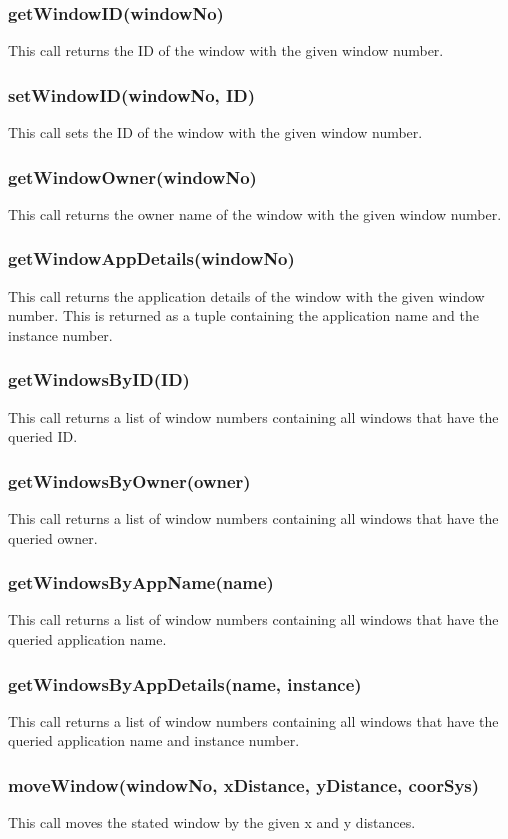 \documentclass{acm_proc_article-sp}
\begin{document}
\subsubsection{getWindowID(windowNo)}
This call returns the ID of the window with the given window number.
\subsubsection{setWindowID(windowNo, ID)}
This call sets the ID of the window with the given window number.
\subsubsection{getWindowOwner(windowNo)}
This call returns the owner name of the window with the given window number.
\subsubsection{getWindowAppDetails(windowNo)}
This call returns the application details of the window with the given window number. This is returned as a tuple containing the application name and the instance number.
\subsubsection{getWindowsByID(ID)}
This call returns a list of window numbers containing all windows that have the queried ID.
\subsubsection{getWindowsByOwner(owner)}
This call returns a list of window numbers containing all windows that have the queried owner.
\subsubsection{getWindowsByAppName(name)}
This call returns a list of window numbers containing all windows that have the queried application name.
\subsubsection{getWindowsByAppDetails(name, instance)}
This call returns a list of window numbers containing all windows that have the queried application name and instance number.
\subsubsection{moveWindow(windowNo, xDistance, yDistance, coorSys)}
This call moves the stated window by the given x and y distances.
\end{document}
